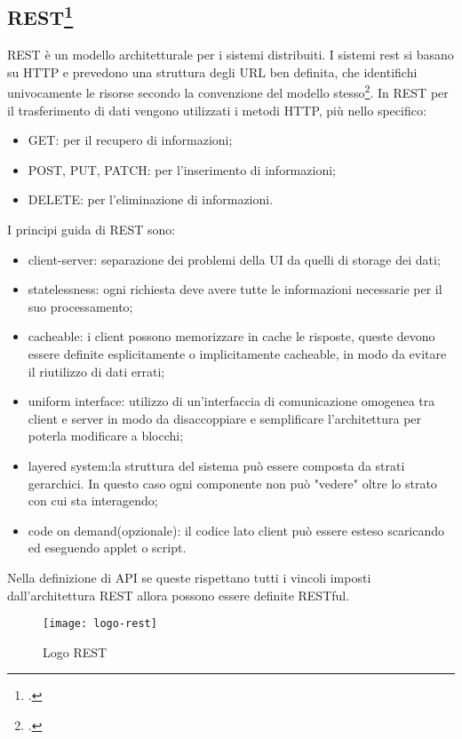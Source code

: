 \subsection{REST\footcite{REST: acronimo di Representational State Transfer}}
REST è un modello architetturale per i sistemi distribuiti. I sistemi rest si basano su HTTP e prevedono una struttura degli URL ben definita, che identifichi univocamente le risorse secondo la convenzione del modello stesso\footcite{Resource Naming: https://restfulapi.net/resource-naming/}. 
In REST per il trasferimento di dati vengono utilizzati i metodi HTTP, più nello specifico:
\begin{itemize}
    \item GET: per il recupero di informazioni;
    \item POST, PUT, PATCH: per l'inserimento di informazioni;
    \item DELETE: per l'eliminazione di informazioni.
\end{itemize}
I principi guida di REST sono:
\begin{itemize}
    \item client-server: separazione dei problemi della UI da quelli di storage dei dati;
    \item statelessness: ogni richiesta deve avere tutte le informazioni necessarie per il suo processamento;
    \item cacheable: i client possono memorizzare in cache le risposte, queste devono essere definite esplicitamente o implicitamente cacheable, in modo da evitare il riutilizzo di dati errati;
    \item uniform interface: utilizzo di un'interfaccia di comunicazione omogenea tra client e server in modo da disaccoppiare e semplificare l'architettura per poterla modificare a blocchi;
    \item layered system:la struttura del sistema può essere composta da strati gerarchici. In questo caso ogni componente non può "vedere" oltre lo strato con cui sta interagendo;
    \item code on demand(opzionale): il codice lato client può essere esteso scaricando ed eseguendo applet o script.
\end{itemize}
Nella definizione di API se queste rispettano tutti i vincoli imposti dall'architettura REST allora possono essere definite RESTful.
\begin{figure}[h]
    \begin{center}
    \texttt{[image: logo-rest]}
    \caption{Logo REST}
    \label{fig:figure6}
    \end{center}
\end{figure}

